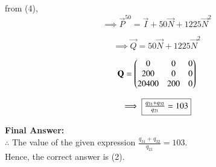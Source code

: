 \documentclass[journal,12pt,onecolumn]{IEEEtran}
\theoremstyle{remark}
\begin{document}
from (4),
\begin{equation}
    \implies \vec{P}^{50} = \vec{I} + 50\vec{N} + 1225\vec{N}^2
\end{equation}

\begin{equation}
    \implies \vec{Q} = 50\vec{N} + 1225\vec{N}^2
\end{equation}

\begin{equation}
    \mathbf{Q} = \begin{pmatrix}0&0&0\\200&0&0\\20400&200&0\end{pmatrix}
\end{equation}

\begin{equation}
    \implies \fbox{$\frac{q_{31}+q_{32}}{q_{21}} = 103$}
\end{equation}

\textbf{Final Answer: }\\
$\therefore$ The value of the given expression $\frac{q_{31}+q_{32}}{q_{21}} = 103$.\\
Hence, the correct answer is (2).
\end{document}

